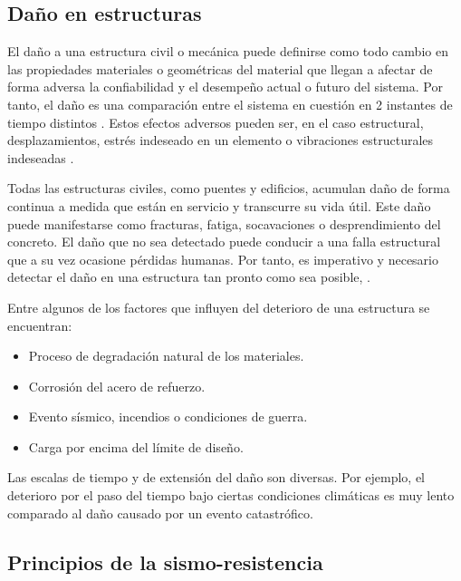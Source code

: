 

\subsection{Daño en estructuras}

El daño a una estructura civil o mecánica puede definirse como todo cambio en las propiedades materiales o geométricas del material que llegan a afectar de forma adversa la confiabilidad y el desempeño actual o futuro del sistema. Por tanto, el daño es una comparación entre el sistema en cuestión en 2 instantes de tiempo distintos \citep{farrar2007introduction}. Estos efectos adversos pueden ser, en el caso estructural, desplazamientos, estrés indeseado en un elemento o vibraciones estructurales indeseadas \citep{chen2018}.

Todas las estructuras civiles, como puentes y edificios, acumulan daño de forma continua a medida que están en servicio y transcurre su vida útil. Este daño puede manifestarse como fracturas, fatiga, socavaciones o desprendimiento del concreto. El daño que no sea detectado puede conducir a una falla estructural que a su vez ocasione pérdidas humanas. Por tanto, es imperativo y necesario detectar el daño en una estructura tan pronto como sea posible, \citep{chen2018}.

Entre algunos de los factores que influyen del deterioro de una estructura se encuentran:
    
        \begin{itemize}
            \item Proceso de degradación natural de los materiales.
            \item Corrosión del acero de refuerzo.
            \item Evento sísmico, incendios o condiciones de guerra.
            \item Carga por encima del límite de diseño.
        \end{itemize}
    
Las escalas de tiempo y de extensión del daño son diversas. Por ejemplo, el deterioro por el paso del tiempo bajo ciertas condiciones climáticas es muy lento comparado al daño causado por un evento catastrófico.

\subsection{Principios de la sismo-resistencia}

